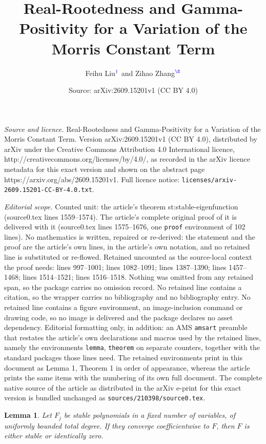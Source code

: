 \documentclass[10pt,a4paper]{amsart}
\title{Real-Rootedness and Gamma-Positivity for a Variation of the Morris Constant Term}
\author{Feihu Liu$^{\color{blue} \dag}$ and Zihao Zhang$^{\color{blue} \S}$}
\date{Source: arXiv:2609.15201v1 (CC BY 4.0)}
\newtheorem{lemma}{Lemma}
\begin{document}
\maketitle

\noindent\emph{Source and licence.} Real-Rootedness and Gamma-Positivity for a Variation of the Morris Constant Term. Version arXiv:2609.15201v1 (CC BY 4.0), distributed by arXiv under the Creative Commons Attribution 4.0 International licence, http://creativecommons.org/licenses/by/4.0/, as recorded in the arXiv licence metadata for this exact version and shown on the abstract page https://arxiv.org/abs/2609.15201v1. Full licence notice: \texttt{licenses/arxiv-2609.15201-CC-BY-4.0.txt}.\par\smallskip

\noindent\textit{Editorial scope.} Counted unit: the article's theorem st:stable-eigenfunction (source0.tex lines 1559--1574). The article's complete original proof of it is delivered with it (source0.tex lines 1575--1676, one \texttt{proof} environment of 102 lines). No mathematics is written, repaired or re-derived: the statement and the proof are the article's own lines, in the article's own notation, and no retained line is substituted or re-flowed.  Retained uncounted as the source-local context the proof needs: lines 997--1001; lines 1082--1091; lines 1387--1390; lines 1457--1468; lines 1514--1521; lines 1516--1518.  Nothing was omitted from any retained span, so the package carries no omission record.  No retained line contains a citation, so the wrapper carries no bibliography and no bibliography entry.  No retained line contains a figure environment, an image-inclusion command or drawing code, so no image is delivered and the package declares no asset dependency.  Editorial formatting only, in addition: an AMS \texttt{amsart} preamble that restates the article's own declarations and macros used by the retained lines, namely the environments \texttt{lemma}, \texttt{theorem} on separate counters, together with the standard packages those lines need.  The retained environments print in this document as Lemma 1, Theorem 1 in order of appearance, whereas the article prints the same items with the numbering of its own full document.  The complete native source of the article as distributed in the arXiv e-print for this exact version is bundled unchanged as \texttt{sources/210398/source0.tex}.
\begin{lemma}\label{st:limit-closure}
Let $F_j$ be stable polynomials in a fixed number of variables, of
uniformly bounded total degree.  If they converge coefficientwise to
$F$, then $F$ is either stable or identically zero.
\end{lemma}
\end{document}
